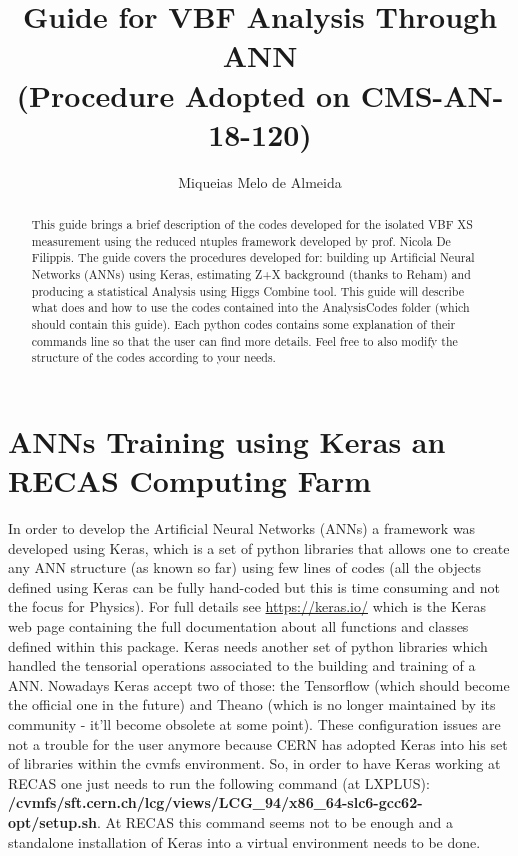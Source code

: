 \documentclass[]{report}
\title{\textbf{Guide for VBF Analysis Through ANN}\\
	(Procedure Adopted on CMS-AN-18-120)}
\author{Miqueias Melo de Almeida}
\begin{document}
\maketitle

\begin{abstract}
This guide brings a brief description of the codes developed for the isolated VBF XS measurement using the reduced ntuples framework developed by prof. Nicola De Filippis. The guide covers the procedures developed for: building up Artificial Neural Networks (ANNs) using Keras, estimating Z+X background (thanks to Reham) and producing a statistical Analysis using Higgs Combine tool. This guide will describe what does and how to use the codes contained into the AnalysisCodes folder (which should contain this guide). Each python codes contains some explanation of their commands line so that the user can find more details. Feel free to also modify the structure of the codes according to your needs.
\end{abstract}

\section{ANNs Training using Keras an RECAS Computing Farm}
In order to develop the Artificial Neural Networks (ANNs) a framework was developed using Keras, which is a set of python libraries that allows one to create any ANN structure (as known so far) using few lines of codes (all the objects defined using Keras can be fully hand-coded but this is time consuming and not the focus for Physics). For full details see \url{https://keras.io/} which is the Keras web page containing the full documentation about all functions and classes defined within this package. Keras needs another set of python libraries which handled the tensorial operations associated to the building and training of a ANN. Nowadays Keras accept two of those: the Tensorflow (which should become the official one in the future) and Theano (which is no longer maintained by its community - it'll become obsolete at some point). These configuration issues are not a trouble for the user anymore because CERN has adopted Keras into his set of libraries within the cvmfs environment. So, in order to have Keras working at RECAS one just needs to run the following command (at LXPLUS): \textbf{/cvmfs/sft.cern.ch/lcg/views/LCG\_94/x86\_64-slc6-gcc62-opt/setup.sh}. At RECAS this command seems not to be enough and a standalone installation of Keras into a virtual environment needs to be done.
\end{document}
